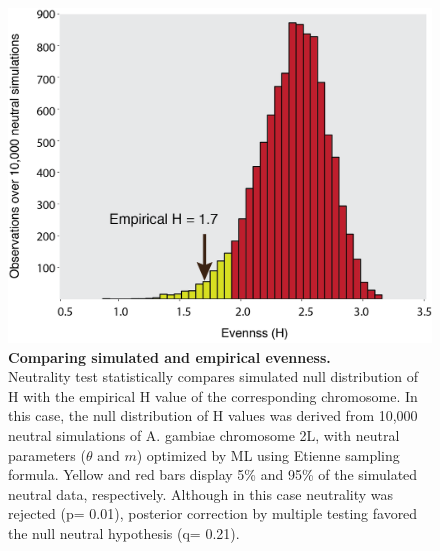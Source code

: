 \begin{figure}[htpb]
\centering 
\includegraphics[width=\textwidth]{tex_source/figures/untb_genomes/shannon_distrib.png}
\caption[Comparing simulated and empirical evenness.]{{\bf Comparing simulated and empirical evenness. }\\Neutrality test statistically compares simulated null distribution of H with the empirical H value of the corresponding chromosome. In this case, the null distribution of H values was derived from 10,000 neutral simulations of A. gambiae chromosome 2L, with neutral parameters ($\theta$ and $m$) optimized by ML using Etienne sampling formula. Yellow and red bars display 5\% and 95\% of the simulated neutral data, respectively. Although in this case neutrality was rejected (p= 0.01), posterior correction by multiple testing favored the null neutral hypothesis (q= 0.21).}
\label{fig:shannon_distrib}
\end{figure}



